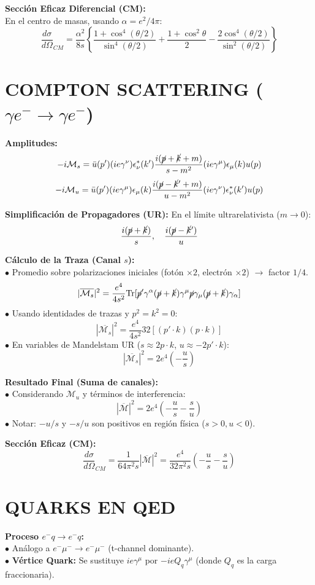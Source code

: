 \textbf{Sección Eficaz Diferencial (CM):}\\
En el centro de masas, usando $\alpha = e^2/4\pi$:
$$ \frac{d\sigma}{d\Omega}_{CM} = \frac{\alpha^2}{8s} \left\{ \frac{1+\cos^4(\theta/2)}{\sin^4(\theta/2)} + \frac{1+\cos^2\theta}{2} - \frac{2\cos^4(\theta/2)}{\sin^2(\theta/2)} \right\} $$

\section{COMPTON SCATTERING ($\gamma e^- \to \gamma e^-$)}

\textbf{Amplitudes:}
$$ -i\mathcal{M}_s = \bar{u}(p') (ie\gamma^\nu) \epsilon_\nu^*(k') \frac{i(\cancel{p}+\cancel{k} + m)}{s-m^2} (ie\gamma^\mu) \epsilon_\mu(k) u(p) $$
$$ -i\mathcal{M}_u = \bar{u}(p') (ie\gamma^\mu) \epsilon_\mu(k) \frac{i(\cancel{p}-\cancel{k}' + m)}{u-m^2} (ie\gamma^\nu) \epsilon_\nu^*(k') u(p) $$

\textbf{Simplificación de Propagadores (UR):} En el límite ultrarelativista ($m \to 0$):
$$ \frac{i(\cancel{p}+\cancel{k})}{s}, \quad \frac{i(\cancel{p}-\cancel{k}')}{u} $$

\textbf{Cálculo de la Traza (Canal $s$):}\\
$\bullet$ Promedio sobre polarizaciones iniciales (fotón $\times 2$, electrón $\times 2$) $\to$ factor $1/4$.\\
$$ |\overline{\mathcal{M}_s}|^2 = \frac{e^4}{4s^2} \text{Tr}[\cancel{p}' \gamma^\alpha (\cancel{p}+\cancel{k}) \gamma^\mu \cancel{p} \gamma_\mu (\cancel{p}+\cancel{k}) \gamma_\alpha] $$
$\bullet$ Usando identidades de trazas y $p^2=k^2=0$:
$$ |\overline{\mathcal{M}_s}|^2 = \frac{e^4}{4s^2} 32 [(p'\cdot k)(p\cdot k)] $$
$\bullet$ En variables de Mandelstam UR ($s \approx 2p\cdot k$, $u \approx -2p' \cdot k$):
$$ |\overline{\mathcal{M}_s}|^2 = 2e^4 \left( -\frac{u}{s} \right) $$

\textbf{Resultado Final (Suma de canales):}\\
$\bullet$ Considerando $\mathcal{M}_u$ y términos de interferencia:
$$ |\overline{\mathcal{M}}|^2 = 2e^4 \left( -\frac{u}{s} - \frac{s}{u} \right) $$
$\bullet$ Notar: $-u/s$ y $-s/u$ son positivos en región física ($s>0, u<0$).

\textbf{Sección Eficaz (CM):}
$$ \frac{d\sigma}{d\Omega}_{CM} = \frac{1}{64\pi^2 s} |\overline{\mathcal{M}}|^2 = \frac{e^4}{32\pi^2 s} \left( -\frac{u}{s} - \frac{s}{u} \right) $$

\section{QUARKS EN QED}
\textbf{Proceso $e^- q \to e^- q$:}\\
$\bullet$ Análogo a $e^- \mu^- \to e^- \mu^-$ (t-channel dominante).\\
$\bullet$ \textbf{Vértice Quark:} Se sustituye $ie\gamma^\mu$ por $-ie Q_q \gamma^\mu$ (donde $Q_q$ es la carga fraccionaria).

